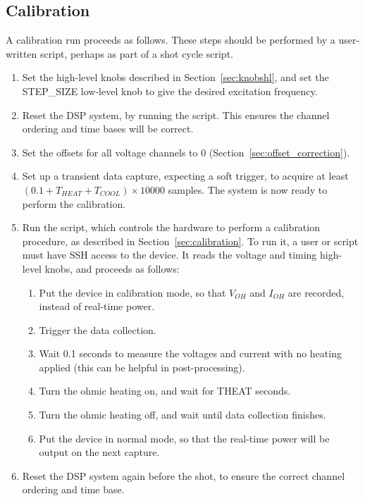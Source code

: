 \documentclass[12pt,a4paper]{article}
\begin{document}
\subsection{Calibration}
\label{sec:run_calibration}
A calibration run proceeds as follows. These steps should be performed by a user-written script, perhaps as part of a shot cycle script.
\begin{enumerate}
\item{Set the high-level knobs described in Section~\ref{sec:knobshl}, and set the STEP{\_}SIZE low-level knob to give the desired excitation
    frequency.}
\item{Reset the DSP system, by running the \mbox{} script. This ensures the channel ordering and time bases will be
    correct.}
\item{Set the offsets for all voltage channels to 0 (Section~\ref{sec:offset_correction})}.
\item{Set up a transient data capture, expecting a soft trigger, to acquire at least $(0.1 + T_{HEAT} + T_{COOL})\times 10000$ samples. The system is now
    ready to perform the calibration.}
\item{Run the \mbox{} script, which controls the hardware to perform a calibration procedure, as described in
    Section~\ref{sec:calibration}. To run it, a user or script must have SSH access to the device. It reads the voltage and timing high-level knobs, and
    proceeds as follows:
\begin{enumerate}
\item{Put the device in calibration mode, so that $V_{OH}$ and $I_{OH}$ are recorded, instead of real-time power.}
\item{Trigger the data collection.}
\item{Wait 0.1 seconds to measure the voltages and current with no heating applied (this can be helpful in post-processing).}
\item{Turn the ohmic heating on, and wait for THEAT seconds}.
\item{Turn the ohmic heating off, and wait until data collection finishes.}
\item{Put the device in normal mode, so that the real-time power will be output on the next capture.}
\end{enumerate}
}
\item{Reset the DSP system again before the shot, to ensure the correct channel ordering and time base.}
\end{enumerate}
\end{document}
